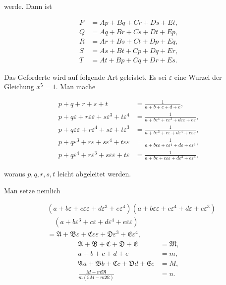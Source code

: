 
\noindent werde. Dann ist

\[
\begin{aligned}
P &= Ap + Bq + Cr + Ds + Et,\\[3pt]
Q &= Aq + Br + Cs + Dt + Ep,\\[3pt]
R &= Ar + Bs + Ct + Dp + Eq,\\[3pt]
S &= As + Bt + Cp + Dq + Er,\\[3pt]
T &= At + Bp + Cq + Dr + Es.
\end{aligned}
\]

Das Geforderte wird auf folgende Art geleistet. Es sei $\varepsilon$ eine Wurzel der
Gleichung $x^5=1$. Man mache

\[
\begin{aligned}
p+q+r+s+t &= \frac{1}{a+b+c+d+e},\\[3pt]
p+q\varepsilon+r\varepsilon\varepsilon+s\varepsilon^3+t\varepsilon^4
  &= \frac{1}{a+b\varepsilon^4+c\varepsilon^3+d\varepsilon\varepsilon+e\varepsilon},\\[3pt]
p+q\varepsilon\varepsilon+r\varepsilon^4+s\varepsilon+t\varepsilon^3
  &= \frac{1}{a+b\varepsilon^3+c\varepsilon+d\varepsilon^4+e\varepsilon\varepsilon},\\[3pt]
p+q\varepsilon^3+r\varepsilon+s\varepsilon^4+t\varepsilon\varepsilon
  &= \frac{1}{a+b\varepsilon\varepsilon+c\varepsilon^4+d\varepsilon+e\varepsilon^3},\\[3pt]
p+q\varepsilon^4+r\varepsilon^3+s\varepsilon\varepsilon+t\varepsilon
  &= \frac{1}{a+b\varepsilon+c\varepsilon\varepsilon+d\varepsilon^3+e\varepsilon^4},
\end{aligned}
\]

\noindent woraus $p, q, r, s, t$ leicht abgeleitet werden.

Man setze nemlich

\[
\begin{aligned}
&(a+b\varepsilon+c\varepsilon\varepsilon+d\varepsilon^3+e\varepsilon^4)
(a+b\varepsilon\varepsilon+c\varepsilon^4+d\varepsilon+e\varepsilon^3)\\
&\quad(a+b\varepsilon^3+c\varepsilon+d\varepsilon^4+e\varepsilon\varepsilon)
\\
&= \mathfrak{A}+\mathfrak{B}\varepsilon+\mathfrak{C}\varepsilon\varepsilon
  +\mathfrak{D}\varepsilon^3+\mathfrak{E}\varepsilon^4,
\end{aligned}
\]
\[
\begin{aligned}
\mathfrak{A}+\mathfrak{B}+\mathfrak{C}+\mathfrak{D}+\mathfrak{E} &= \mathfrak{M},\\[3pt]
a+b+c+d+e &= m,\\[3pt]
\mathfrak{A}a+\mathfrak{B}b+\mathfrak{C}c+\mathfrak{D}d+\mathfrak{E}e &= M,\\[3pt]
\frac{M-m\mathfrak{M}}{m(5M-m\mathfrak{M})} &= n.
\end{aligned}
\]

